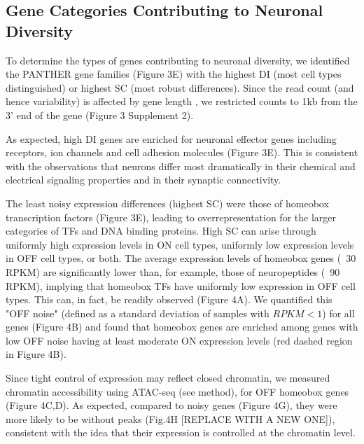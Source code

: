 \subsection{Gene Categories Contributing to Neuronal Diversity}

To determine the types of genes contributing to neuronal diversity, we identified the PANTHER gene families (Figure 3E) with the highest DI (most cell types distinguished) or highest SC (most robust differences). Since the read count (and hence variability) is affected by gene length \cite{Oshlack_2009}, we restricted counts to 1kb from the 3' end of the gene (Figure 3 Supplement 2). 

As expected, high DI genes are enriched for neuronal effector genes including receptors, ion channels and cell adhesion molecules (Figure 3E). This is consistent with the observations that neurons differ most dramatically in their chemical and electrical signaling properties and in their synaptic connectivity.

The least noisy expression differences (highest SC) were those of homeobox transcription factors (Figure 3E), leading to overrepresentation for the larger categories of TFs and DNA binding proteins. High SC can arise through uniformly high expression levels in ON cell types, uniformly low expression levels in OFF cell types, or both. The average expression levels of homeobox genes (~30 RPKM) are significantly lower than, for example, those of  neuropeptides (~90 RPKM), implying that homeobox TFs have uniformly low expression in OFF cell types. This can, in fact, be readily observed (Figure 4A). We quantified this "OFF noise" (defined as a standard deviation of samples with $RPKM<1$) for all genes (Figure 4B) and found that homeobox genes are enriched among genes with low OFF noise having at least moderate ON expression levels (red dashed region in Figure 4B).

Since tight control of expression may reflect closed chromatin, we measured chromatin accessibility using ATAC-seq (see method), for OFF homeobox genes (Figure 4C,D). As expected, compared to noisy genes (Figure 4G), they were more likely to be without peaks (Fig.4H [REPLACE WITH A NEW ONE]), consistent with the idea that their expression is controlled at the chromatin level.

